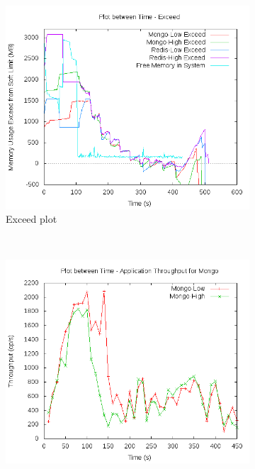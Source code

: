 	\begin{figure}[t!]
	  \centering
	  \begin{subfigure}[t]{0.48\textwidth}
	    \centering
	    \includegraphics[width=1\textwidth]{images/inference/complete.png}
	    \caption{Exceed plot}
	    \label{plot_inference_complete}
	  \end{subfigure}
	  ~ 
	  \begin{subfigure}[t]{0.48\textwidth}
	    \centering
	    \includegraphics[width=1\textwidth]{images/inference/complete_mongo.png}

\end{subfigure}
\end{figure}

